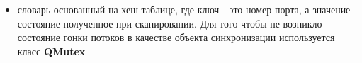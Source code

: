 \begin{itemize}
\tightlist
\item
  словарь основанный на хеш таблице, где ключ - это номер порта, а
  значение - состояние полученное при сканировании. Для того чтобы не
  возникло состояние гонки потоков в качестве объекта синхронизации
  используется класс \textbf{QMutex}
\end{itemize}
